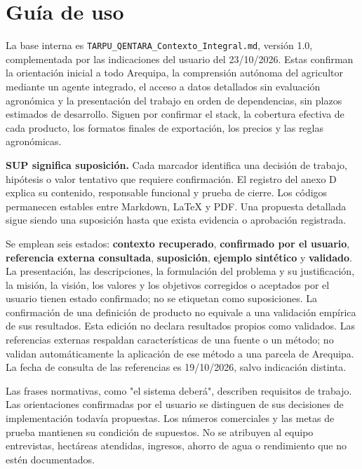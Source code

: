 \documentclass[10pt,a4paper]{article}
\begin{document}
\section{Guía de uso}\label{guía-de-uso}

La base interna es \texttt{TARPU\_\allowbreak{}QENTARA\_\allowbreak{}Contexto\_\allowbreak{}Integral.md}, versión 1.0, complementada por las indicaciones del usuario del 23/\allowbreak{}10/\allowbreak{}2026. Estas confirman la orientación inicial a todo Arequipa, la comprensión autónoma del agricultor mediante un agente integrado, el acceso a datos detallados sin evaluación agronómica y la presentación del trabajo en orden de dependencias, sin plazos estimados de desarrollo. Siguen por confirmar el stack, la cobertura efectiva de cada producto, los formatos finales de exportación, los precios y las reglas agronómicas.


\textbf{SUP significa suposición.} Cada marcador  identifica una decisión de trabajo, hipótesis o valor tentativo que requiere confirmación. El registro del anexo D explica su contenido, responsable funcional y prueba de cierre. Los códigos permanecen estables entre Markdown, LaTeX y PDF. Una propuesta detallada sigue siendo una suposición hasta que exista evidencia o aprobación registrada.


Se emplean seis estados: \textbf{contexto recuperado}, \textbf{confirmado por el usuario}, \textbf{referencia externa consultada}, \textbf{suposición}, \textbf{ejemplo sintético} y \textbf{validado}. La presentación, las descripciones, la formulación del problema y su justificación, la misión, la visión, los valores y los objetivos corregidos o aceptados por el usuario tienen estado confirmado; no se etiquetan como suposiciones. La confirmación de una definición de producto no equivale a una validación empírica de sus resultados. Esta edición no declara resultados propios como validados. Las referencias externas respaldan características de una fuente o un método; no validan automáticamente la aplicación de ese método a una parcela de Arequipa. La fecha de consulta de las referencias es 19/\allowbreak{}10/\allowbreak{}2026, salvo indicación distinta.


Las frases normativas, como "el sistema deberá", describen requisitos de trabajo. Las orientaciones confirmadas por el usuario se distinguen de sus decisiones de implementación todavía propuestas. Los números comerciales y las metas de prueba mantienen su condición de supuestos. No se atribuyen al equipo entrevistas, hectáreas atendidas, ingresos, ahorro de agua o rendimiento que no estén documentados.
\end{document}
